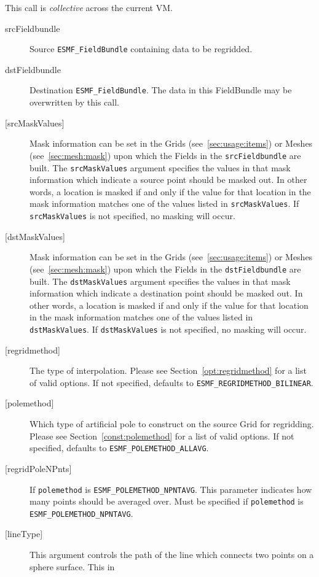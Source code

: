    This call is {\em collective} across the current VM.
  
   \begin{description}
   \item [srcFieldbundle]
   Source {\tt ESMF\_FieldBundle} containing data to be regridded.
   \item [dstFieldbundle]
   Destination {\tt ESMF\_FieldBundle}. The data in this FieldBundle may be overwritten by this call.
   \item [{[srcMaskValues]}]
   Mask information can be set in the Grids (see~\ref{sec:usage:items}) or Meshes (see~\ref{sec:mesh:mask}) upon which
   the Fields in the {\tt srcFieldbundle} are built.
   The {\tt srcMaskValues} argument specifies the values in that mask information which indicate a source point should be masked out.
   In other words, a location is masked if and only if the value for that location in the mask information matches
   one of the values listed in {\tt srcMaskValues}.
   If {\tt srcMaskValues} is not specified, no masking will occur.
   \item [{[dstMaskValues]}]
   Mask information can be set in the Grids (see~\ref{sec:usage:items}) or Meshes (see~\ref{sec:mesh:mask})
   upon which the Fields in the {\tt dstFieldbundle} are built.
   The {\tt dstMaskValues} argument specifies the values in that mask information which indicate a destination point should be masked out.
   In other words, a location is masked if and only if the value for that location in the mask information matches
   one of the values listed in {\tt dstMaskValues}.
   If {\tt dstMaskValues} is not specified, no masking will occur.
   \item [{[regridmethod]}]
   The type of interpolation. Please see Section~\ref{opt:regridmethod} for a list of
   valid options. If not specified, defaults to {\tt ESMF\_REGRIDMETHOD\_BILINEAR}.
   \item [{[polemethod]}]
   Which type of artificial pole
   to construct on the source Grid for regridding. Please see Section~\ref{const:polemethod} for a list of
   valid options. If not specified, defaults to {\tt ESMF\_POLEMETHOD\_ALLAVG}.
   \item [{[regridPoleNPnts]}]
   If {\tt polemethod} is {\tt ESMF\_POLEMETHOD\_NPNTAVG}.
   This parameter indicates how many points should be averaged
   over. Must be specified if {\tt polemethod} is
   {\tt ESMF\_POLEMETHOD\_NPNTAVG}.
   \item [{[lineType]}]
   This argument controls the path of the line which connects two points on a sphere surface. This in

\end{description}

